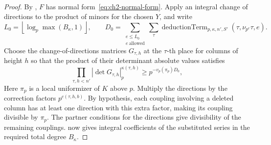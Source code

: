 \begin{proof}
By , $F$ has normal form~\eqref{eq:ch2-normal-form}. Apply an integral change of directions to the product of minors for the chosen $Y$, and write
\[
 L_0=\left\lfloor\log_p\max(B_\kappa,1)\right\rfloor,\qquad
 D_0=\sum_{\substack{e\le L_0\\ e\ \text{allowed}}}
          \sum_\tau \operatorname{deductionTerm}_{p,\kappa,n',S'}(\tau,\nu_{p^e}\tau,e).
\]
Choose the change-of-directions matrices $G_{\tau,h}$ at the $\tau$-th place for columns of height $h$ so that the product of their determinant absolute values satisfies
\[
 \prod_{\tau,h<n'}|\det G_{\tau,h}|_p^{\kappa(\tau,h)}
 \ge p^{-v_p(\pi_p)D_0},
\]
Here $\pi_p$ is a local uniformizer of $K$ above $p$. Multiply the directions by the correction factors $p^{c(\tau,h,b)}$. By hypothesis, each coupling involving a deleted column has at least one direction with this extra factor, making its coupling divisible by $\pi_p$. The partner conditions for the directions give divisibility of the remaining couplings.  now gives integral coefficients of the substituted series in the required total degree $B_\kappa$.


\end{proof}
